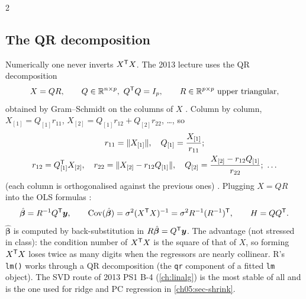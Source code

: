 \begin{paracol}{2}
\subsection{The QR decomposition}\label{ch05:sec-qr}
Numerically one never inverts $X^{\mathsf T} X$. The 2013 lecture  uses the QR decomposition
\[
  X=QR,\qquad Q\in\mathbb{R}^{n\times p},\ Q^{\mathsf T} Q=I_p,\qquad R\in\mathbb{R}^{p\times p}\ \text{upper triangular},
\]
obtained by Gram--Schmidt on the columns of $X$ . Column by column,
$X_{[1]}=Q_{[1]}r_{11}$, $X_{[2]}=Q_{[1]}r_{12}+Q_{[2]}r_{22}$, \dots, so
\[\begin{gathered}
  r_{11}=\|X_{[1]}\|,\quad Q_{[1]}=\frac{X_{[1]}}{r_{11}};\\
  r_{12}=Q_{[1]}^{\mathsf T} X_{[2]},\quad r_{22}=\|X_{[2]}-r_{12}Q_{[1]}\|,\quad Q_{[2]}=\frac{X_{[2]}-r_{12}Q_{[1]}}{r_{22}};\ \dots
  \end{gathered}\]
(each column is orthogonalised against the previous ones) . Plugging $X=QR$ into the OLS
formulas :
\[
  \hat{\bm\beta}=R^{-1}Q^{\mathsf T}\bm y,\qquad \operatorname{Cov}(\hat{\bm\beta})=\sigma^2(X^{\mathsf T} X)^{-1}=\sigma^2R^{-1}(R^{-1})^{\mathsf T},\qquad H=QQ^{\mathsf T} .
\]
$\hat{\bm\beta}$ is computed by back-substitution in $R\hat{\bm\beta}=Q^{\mathsf T}\bm y$. The advantage (not stressed in
class): the condition number of $X^{\mathsf T} X$ is the square of that of $X$, so forming $X^{\mathsf T} X$ loses twice as many
digits when the regressors are nearly collinear. R's \texttt{lm()} works through a QR decomposition (the
\texttt{qr} component of a fitted \texttt{lm} object). The SVD route of 2013 PS1 B-4 (\cref{ch:linalg}) is
the most stable of all and is the one used for ridge and PC regression in \cref{ch05:sec-shrink}.


\end{paracol}
